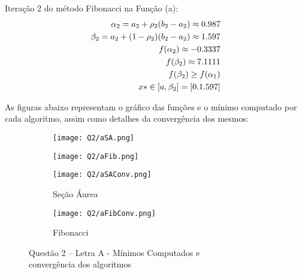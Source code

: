 \documentclass[fleqn, 11pt]{article}
\begin{document}
\hfill Iteração 2 do método Fibonacci na Função (a):
\begin{align*}
\begin{split}
\hfill \alpha_2 = a_2 + \rho_2 (b_2 - a_2) \approx 0.987 \\
\hfill \beta_2 = a_2 + (1 - \rho_2) (b_2 - a_2) \approx 1.597 \\
\hfill f(\alpha_2) \approx -0.3337 \\
\hfill f(\beta_2) \approx 7.1111 \\
\hfill f(\beta_2) \geq f(\alpha_1) \\
\hfill x* \in [a, \beta_2] = [0. 1.597]
\end{split}
\end{align*}


As figuras abaixo representam o gráfico das funções e o mínimo computado por cada algoritmo, assim como detalhes da convergência dos mesmos:

\begin{figure}[H]
\centering
\begin{subfigure}{.5\textwidth}
  \centering
  \texttt{[image: Q2/aSA.png]}
\end{subfigure}%
\begin{subfigure}{.5\textwidth}
  \centering
  \texttt{[image: Q2/aFib.png]}
\end{subfigure}

\centering
\begin{subfigure}{.5\textwidth}
  \centering
  \texttt{[image: Q2/aSAConv.png]}
  \caption{Seção Áurea}
\end{subfigure}%
\begin{subfigure}{.5\textwidth}
  \centering
  \texttt{[image: Q2/aFibConv.png]}
  \caption{Fibonacci}
\end{subfigure}
\caption{Questão 2 -- Letra A - Mínimos Computados e \\ convergência dos algoritmos}
\label{Q2A}
\end{figure}
\end{document}
